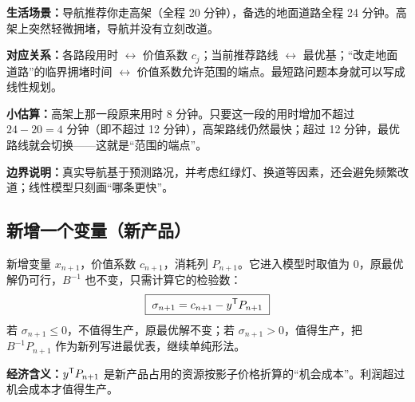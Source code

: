 \begin{lifebox}
\begin{minipage}[t]{0.55\linewidth}
\textbf{生活场景：}导航推荐你走高架（全程 20 分钟），备选的地面道路全程 24 分钟。高架上突然轻微拥堵，导航并没有立刻改道。\par
\textbf{对应关系：}各路段用时 $\leftrightarrow$ 价值系数 $c_j$；当前推荐路线 $\leftrightarrow$ 最优基；“改走地面道路”的临界拥堵时间 $\leftrightarrow$ 价值系数允许范围的端点。最短路问题本身就可以写成线性规划。\par
\textbf{小估算：}高架上那一段原来用时 8 分钟。只要这一段的用时增加不超过 $24-20=4$ 分钟（即不超过 12 分钟），高架路线仍然最快；超过 12 分钟，最优路线就会切换——这就是“范围的端点”。\par
\textbf{边界说明：}真实导航基于预测路况，并考虑红绿灯、换道等因素，还会避免频繁改道；线性模型只刻画“哪条更快”。
\end{minipage}\hfill
\begin{minipage}[t]{0.41\linewidth}\vspace{0pt}\centering
{}
\end{minipage}
\end{lifebox}

\subsection{新增一个变量（新产品）}

\begin{theorembox}
新增变量 $x_{n+1}$，价值系数 $c_{n+1}$，消耗列 $P_{n+1}$。它进入模型时取值为 0，原最优解仍可行，$B^{-1}$ 也不变，只需计算它的检验数：
\[
\boxed{\;\sigma_{n+1}=c_{n+1}-y^{\mathsf T} P_{n+1}\;}
\]
若 $\sigma_{n+1}\le0$，不值得生产，原最优解不变；若 $\sigma_{n+1}>0$，值得生产，把 $B^{-1}P_{n+1}$ 作为新列写进最优表，继续单纯形法。\par
\textbf{经济含义：}$y^{\mathsf T} P_{n+1}$ 是新产品占用的资源按影子价格折算的“机会成本”。利润超过机会成本才值得生产。
\end{theorembox}

